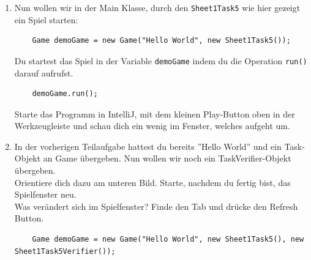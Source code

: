 
\label{ex5}

\begin{enumerate}
    \item Nun wollen wir in der Main Klasse, durch
    den \lstinline{Sheet1Task5} wie hier gezeigt ein Spiel starten:
    
    \begin{lstlisting}
    Game demoGame = new Game("Hello World", new Sheet1Task5());
    \end{lstlisting}
    
    Du startest das Spiel in der Variable \lstinline{demoGame} indem du die Operation \lstinline{run()} darauf aufrufst.
    
    \begin{lstlisting}
    demoGame.run();
    \end{lstlisting}
    
    Starte das Programm in IntelliJ, mit dem kleinen Play-Button oben in der Werkzeugleiste und schau dich ein wenig im Fenster, welches aufgeht um.
    
    \vspace{5mm}
    
    \item In der vorherigen Teilaufgabe hattest du bereits ''Hello World'' und ein Task-Objekt an Game übergeben.
    Nun wollen wir noch ein TaskVerifier-Objekt übergeben.\\
    Orientiere dich dazu am unteren Bild. Starte, nachdem du fertig bist, das Spielfenster neu. \\
    
    Was verändert sich im Spielfenster?
    Finde den  Tab und drücke den Refresh Button.
    
    \begin{lstlisting}
    Game demoGame = new Game("Hello World", new Sheet1Task5(), new Sheet1Task5Verifier());
    \end{lstlisting}
    
    \end{enumerate}

